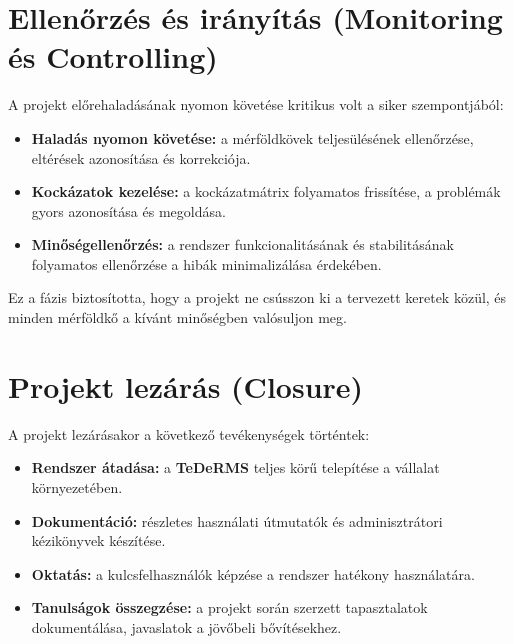 \section{Ellenőrzés és irányítás (Monitoring és Controlling)}

A projekt előrehaladásának nyomon követése kritikus volt a siker szempontjából:
\begin{itemize}
    \item \textbf{Haladás nyomon követése:} a mérföldkövek teljesülésének ellenőrzése, eltérések azonosítása és korrekciója.
    \item \textbf{Kockázatok kezelése:} a kockázatmátrix folyamatos frissítése, a problémák gyors azonosítása és megoldása.
    \item \textbf{Minőségellenőrzés:} a rendszer funkcionalitásának és stabilitásának folyamatos ellenőrzése a hibák minimalizálása érdekében.
\end{itemize}

Ez a fázis biztosította, hogy a projekt ne csússzon ki a tervezett keretek közül, és minden mérföldkő a kívánt minőségben valósuljon meg.

\section{Projekt lezárás (Closure)}

A projekt lezárásakor a következő tevékenységek történtek:
\begin{itemize}
    \item \textbf{Rendszer átadása:} a \textbf{TeDeRMS} teljes körű telepítése a vállalat környezetében.
    \item \textbf{Dokumentáció:} részletes használati útmutatók és adminisztrátori kézikönyvek készítése.
    \item \textbf{Oktatás:} a kulcsfelhasználók képzése a rendszer hatékony használatára.
    \item \textbf{Tanulságok összegzése:} a projekt során szerzett tapasztalatok dokumentálása, javaslatok a jövőbeli bővítésekhez.
\end{itemize}


